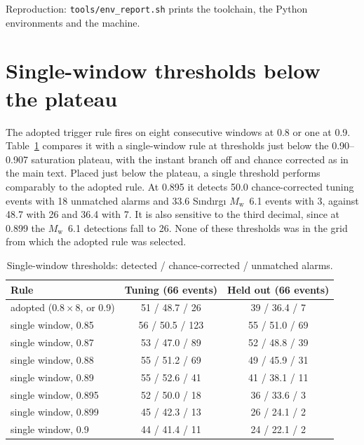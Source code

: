 \documentclass[11pt,a4paper]{article}
\newcommand{\Mw}{$M_\mathrm{w}$}
\newcommand{\tool}[1]{\nolinkurl{#1}}
\begin{document}
\noindent Reproduction: \tool{tools/env_report.sh} prints the toolchain, the
Python environments and the machine.

\clearpage
\section{Single-window thresholds below the plateau}\label{s:singlewindow}

The adopted trigger rule fires on eight consecutive windows at 0.8 or one at
0.9. Table~\ref{t:singlewindow} compares it with a single-window rule at
thresholds just below the 0.90--0.907 saturation plateau, with the instant
branch off and chance corrected as in the main text. Placed just below the
plateau, a single threshold performs comparably to the adopted rule. At 0.895 it detects 50.0 chance-corrected tuning events with 18 unmatched alarms and
33.6 S\i{}nd\i{}rg\i{} \Mw{}~6.1 events with 3, against 48.7 with 26 and 36.4 with 7. It is also sensitive to the third decimal, since at 0.899 the \Mw{}~6.1 detections fall to 26.
None of these thresholds was in the grid from which the adopted rule was
selected.

\begin{table}[htbp]
  \centering\small
  \caption{Single-window thresholds: detected / chance-corrected / unmatched
  alarms.}\label{t:singlewindow}
  \begin{tabular}{@{}lcc@{}}
    \toprule
    Rule & Tuning (66 events) & Held out (66 events) \\
    \midrule
    adopted ($0.8 \times 8$, or 0.9) & 51 / 48.7 / 26 & 39 / 36.4 / 7 \\
    single window, 0.85 & 56 / 50.5 / 123 & 55 / 51.0 / 69 \\
    single window, 0.87 & 53 / 47.0 / 89 & 52 / 48.8 / 39 \\
    single window, 0.88 & 55 / 51.2 / 69 & 49 / 45.9 / 31 \\
    single window, 0.89 & 55 / 52.6 / 41 & 41 / 38.1 / 11 \\
    single window, 0.895 & 52 / 50.0 / 18 & 36 / 33.6 / 3 \\
    single window, 0.899 & 45 / 42.3 / 13 & 26 / 24.1 / 2 \\
    single window, 0.9 & 44 / 41.4 / 11 & 24 / 22.1 / 2 \\
    \bottomrule
  \end{tabular}
\end{table}
\end{document}
